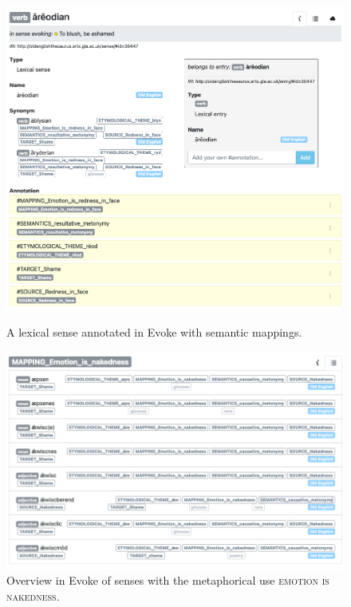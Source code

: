 \begin{figure}[h]
\centering
\begin{minipage}{.48\textwidth}
  \includegraphics[width=\textwidth]{Stolk2021x/fig/Khan-areodian.png}
	\caption[]{\label{fig:Stolk2021x:Khan-fig1}A lexical sense annotated in Evoke with semantic mappings.}
\end{minipage}
\begin{minipage}{.04\textwidth}\end{minipage}
\begin{minipage}{.48\textwidth}
  \includegraphics[width=\textwidth]{Stolk2021x/fig/Khan-metaphor-mapping.png}
	\caption[]{\label{fig:Stolk2021x:Khan-fig2}Overview in Evoke of senses with the metaphorical use \textsc{emotion is nakedness}.}
\end{minipage}
\end{figure}


